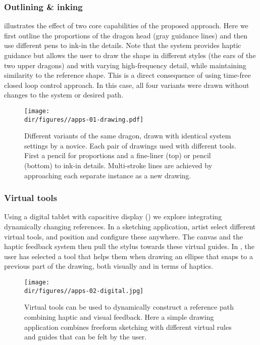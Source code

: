 \subsubsection*{Outlining \& inking}
 illustrates the effect of two core capabilities of the proposed approach. 
Here we first outline the proportions of the dragon head (gray guidance lines) and then use different pens to ink-in the details. 
Note that the system provides haptic guidance but allows the user to draw the shape in different styles (\eg the ears of the two upper dragons) and with varying high-frequency detail, while maintaining similarity to the reference shape. 
This is a direct consequence of using time-free closed loop control approach.
In this case, all four variants were drawn without changes to the system or desired path. 
\begin{figure}[!t]
    \centering
        \texttt{[image: \\dir/figures//apps-01-drawing.pdf]}
    \caption{Different variants of the same dragon, drawn with identical system settings by a novice. Each pair of drawings used with different tools. First a pencil for proportions and a fine-liner (top) or pencil (bottom) to ink-in details. Multi-stroke lines are achieved by approaching each separate instance as a new drawing.}
    \label{fig:dragon}
\end{figure}


\subsubsection*{Virtual tools}
Using a digital tablet with capacitive display () we explore integrating dynamically changing references. 
In a sketching application, artist select different virtual tools, and position and configure these anywhere. 
The canvas and the haptic feedback system then pull the stylus towards these virtual guides. 
In , the user has selected a tool that helps them when drawing an ellipse that snaps to a previous part of the drawing, both visually and in terms of haptics.

\begin{figure}[!t]
    \vspace{-.5em}
    \centering
    \texttt{[image: \\dir/figures//apps-02-digital.jpg]}    \caption{Virtual tools can be used to dynamically construct a reference path combining haptic and visual feedback. Here  a simple drawing application combines freeform sketching with different virtual rules and guides that can be felt by the user.}
        \label{fig:tablet}
    \vspace{-.5em}
\end{figure}

